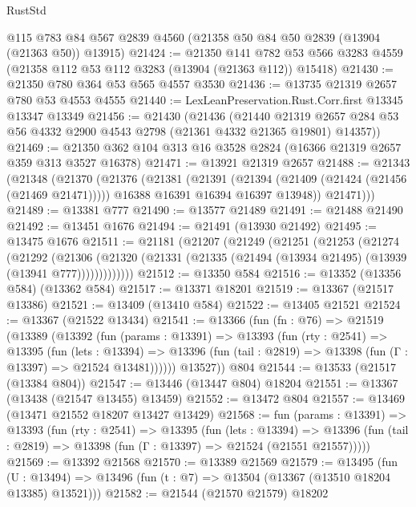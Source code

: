 \begin{lexlean}{RustStd}
\begin{coremodule}
    @115
    @783
    @84
    @567
    @2839
    @4560
    (@21358 @50 @84 @50 @2839 (@13904 (@21363 @50)) @13915)
@21424 := @21350
    @141
    @782
    @53
    @566
    @3283
    @4559
    (@21358 @112 @53 @112 @3283 (@13904 (@21363 @112)) @15418)
@21430 := @21350 @780 @364 @53 @565 @4557 @3530
@21436 := @13735 @21319 @2657 @780 @53 @4553 @4555
@21440 := LexLeanPreservation.Rust.Corr.first @13345 @13347 @13349
@21456 := @21430
    (@21436
      (@21440
        @21319
        @2657
        @284
        @53
        @56
        @4332
        @2900
        @4543
        @2798
        (@21361 @4332 @21365 @19801)
        @14357))
@21469 := @21350 @362 @104 @313 @16 @3528 @2824 (@16366 @21319 @2657 @359 @313 @3527 @16378)
@21471 := @13921 @21319 @2657
@21488 := @21343
    (@21348
      (@21370
        (@21376
          (@21381
            (@21391
              (@21394 (@21409 (@21424 (@21456 (@21469 @21471)))))
              @16388
              @16391
              @16394
              @16397
              @13948))
          @21471)))
@21489 := @13381 @777
@21490 := @13577 @21489
@21491 := @21488 @21490
@21492 := @13451 @1676
@21494 := @21491 (@13930 @21492)
@21495 := @13475 @1676
@21511 := @21181
    (@21207
      (@21249
        (@21251
          (@21253
            (@21274
              (@21292
                (@21306
                  (@21320 (@21331 (@21335 (@21494 (@13934 @21495) (@13939 (@13941 @777)))))))))))))
@21512 := @13350 @584
@21516 := @13352 (@13356 @584) (@13362 @584)
@21517 := @13371 @18201
@21519 := @13367 (@21517 @13386)
@21521 := @13409 (@13410 @584)
@21522 := @13405 @21521
@21524 := @13367 (@21522 @13434)
@21541 := @13366
    (fun (fn : @76) =>
    @21519
      (@13389
        (@13392
          (fun (params : @13391) =>
          @13393
            (fun (rty : @2541) =>
            @13395
              (fun (lets : @13394) =>
              @13396 (fun (tail : @2819) => @13398 (fun (Γ : @13397) => @21524 @13481))))))
        @13527))
    @804
@21544 := @13533 (@21517 (@13384 @804))
@21547 := @13446 (@13447 @804) @18204
@21551 := @13367 (@13438 (@21547 @13455) @13459)
@21552 := @13472 @804
@21557 := @13469 (@13471 @21552 @18207 @13427 @13429)
@21568 := fun (params : @13391) =>
  @13393
    (fun (rty : @2541) =>
    @13395
      (fun (lets : @13394) =>
      @13396 (fun (tail : @2819) => @13398 (fun (Γ : @13397) => @21524 (@21551 @21557)))))
@21569 := @13392 @21568
@21570 := @13389 @21569
@21579 := @13495
    (fun (U : @13494) => @13496 (fun (t : @7) => @13504 (@13367 (@13510 @18204 @13385) @13521)))
@21582 := @21544 (@21570 @21579) @18202

\end{coremodule}
\end{lexlean}
